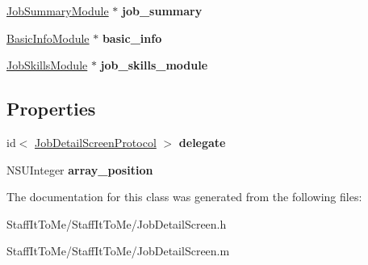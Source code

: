 \begin{DoxyCompactItemize}
\item 
\hypertarget{interface_job_detail_screen_aac357559a4f4281f9f9601f0b67516f8}{
\hyperlink{interface_job_summary_module}{\-Job\-Summary\-Module} $\ast$ {\bfseries job\-\_\-summary}}
\label{interface_job_detail_screen_aac357559a4f4281f9f9601f0b67516f8}

\item 
\hypertarget{interface_job_detail_screen_a317650bbc1e053957e5cdb786d19d22c}{
\hyperlink{interface_basic_info_module}{\-Basic\-Info\-Module} $\ast$ {\bfseries basic\-\_\-info}}
\label{interface_job_detail_screen_a317650bbc1e053957e5cdb786d19d22c}

\item 
\hypertarget{interface_job_detail_screen_a445eec0257ecc1abd0cb7db315487ea9}{
\hyperlink{interface_job_skills_module}{\-Job\-Skills\-Module} $\ast$ {\bfseries job\-\_\-skills\-\_\-module}}
\label{interface_job_detail_screen_a445eec0257ecc1abd0cb7db315487ea9}

\end{DoxyCompactItemize}
\subsection*{\-Properties}
\begin{DoxyCompactItemize}
\item 
\hypertarget{interface_job_detail_screen_ae377e7d3a1d39b3be9b7232623864611}{
id$<$ \hyperlink{protocol_job_detail_screen_protocol-p}{\-Job\-Detail\-Screen\-Protocol} $>$ {\bfseries delegate}}
\label{interface_job_detail_screen_ae377e7d3a1d39b3be9b7232623864611}

\item 
\hypertarget{interface_job_detail_screen_a046ecf8b08b4907bc27a2a0182af017b}{
\-N\-S\-U\-Integer {\bfseries array\-\_\-position}}
\label{interface_job_detail_screen_a046ecf8b08b4907bc27a2a0182af017b}

\end{DoxyCompactItemize}


\-The documentation for this class was generated from the following files\-:\begin{DoxyCompactItemize}
\item 
\-Staff\-It\-To\-Me/\-Staff\-It\-To\-Me/\-Job\-Detail\-Screen.\-h\item 
\-Staff\-It\-To\-Me/\-Staff\-It\-To\-Me/\-Job\-Detail\-Screen.\-m\end{DoxyCompactItemize}
